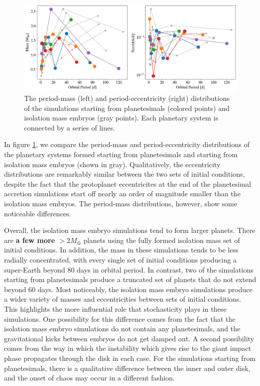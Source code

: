 \begin{figure}
\begin{center}
    \includegraphics[width=\textwidth]{figures/stip/per_mass_ecc_iso_comp.png}
    \caption{The period-mass (left) and period-eccentricity (right) distributions of the simulations starting from planetesimals (colored points) and isolation mass embryos (gray points). Each planetary system is connected by a series of lines.\label{fig:per_mass_ecc_iso_comp}}
\end{center}
\end{figure}


In figure \ref{fig:per_mass_ecc_iso_comp}, we compare the period-mass and period-eccentricity distributions of the planetary systems formed starting from planetesimals and starting from isolation mass embryos (shown in gray). Qualitatively, the eccentricity distributions are remarkably similar between the two sets of initial conditions, despite the fact that the protoplanet eccentricites at the end of the planetesimal accretion simulations start off nearly an order of magnitude smaller than the isolation mass embryos. The period-mass distributions, however, show some noticeable differences.

Overall, the isolation mass embryo simulations tend to form larger planets. There are \textbf{a few more} $> 2 M_{\oplus}$ planets using the fully formed isolation mass set of initial conditions. In addition, the mass in these simulations tends to be less radially concentrated, with every single set of initial conditions producing a super-Earth beyond 80 days in orbital period. In contrast, two of the simulations starting from planetesimals produce a truncated set of planets that do not extend beyond 60 days. Most noticeably, the isolation mass embryo simulations produce a wider variety of masses and eccentricities between sets of initial conditions. This highlights the more influential role that stochasticity plays in these simulations. One possibility for this difference comes from the fact that the isolation mass embryo simulations do not contain any planetesimals, and the gravitational kicks between embryos do not get damped out. A second possibility comes from the way in which the instability which gives rise to the giant impact phase propagates through the disk in each case. For the simulations starting from planetesimals, there is a qualitative difference between the inner and outer disk, and the onset of chaos may occur in a different fashion.

